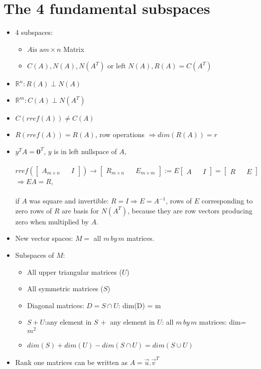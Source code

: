 \documentclass[a4paper,12pt]{article}
\begin{document}
\section{The 4 fundamental subspaces}
\begin{itemize}
	\item 4 subspaces:
	\begin{itemize}
		\item $A \text{is a} m \times n$ Matrix
		\item $C(A),N(A), N(A^T) \text{ or left } N(A), R(A) = C(A^T)$
	\end{itemize}
	\item $\mathbf{\mathbb{R}}^n: R(A) \perp N(A)$ 
	\item $\mathbf{\mathbb{R}}^m: C(A) \perp N(A^T)$
	\item $C(rref(A)) \neq C(A)$
	\item $R(rref(A)) = R(A)$, row operations $\Longrightarrow dim(R(A)) = r$
	\item $y^T A = \mathbf{0}^T $, $y$ is in left nullspace of $A$,\\
	\\
		$rref(\begin{bmatrix}
		A_{m \times n} & & I 
		\end{bmatrix}) \longrightarrow    
		\begin{bmatrix}
R_{m \times n} & & E_{m \times m}
		\end{bmatrix}		
 := E
 \begin{bmatrix}
 A& & I
 \end{bmatrix}
  = \begin{bmatrix}
   R& & E
   \end{bmatrix}$ \\
   $ \Longrightarrow EA = R$, \\
   \\
		 if $A$ was square and invertible: $R = I \Rightarrow E = A^{-1}$, rows of $E$ corresponding to zero rows of $R$ are basis for $N(A^T)$, because they are row vectors producing zero when multiplied by $A$.
		 
		 \item New vector spaces: $M = $ all $m\,by\,m$ matrices.
		 \item Subspaces of $M$: 
		 \begin{itemize}
		 	\item All upper triangular matrices ($U$)
		 	\item All symmetric matrices ($S$)
		 	\item Diagonal matrices: $D = S \cap U$: dim(D) = m
		 	\item $S+U$:any element in $S\,+$ any element in $U$: all $m\,by\,m$ matrices: dim=$m^2$
			\item $dim(S)+dim(U) - dim(S \cap U) = dim(S \cup U)$		 	
		 \end{itemize}
		 
		 \item Rank one matrices can be written as $A = \vec{u}.\vec{v}^T$
\end{itemize}
\end{document}
